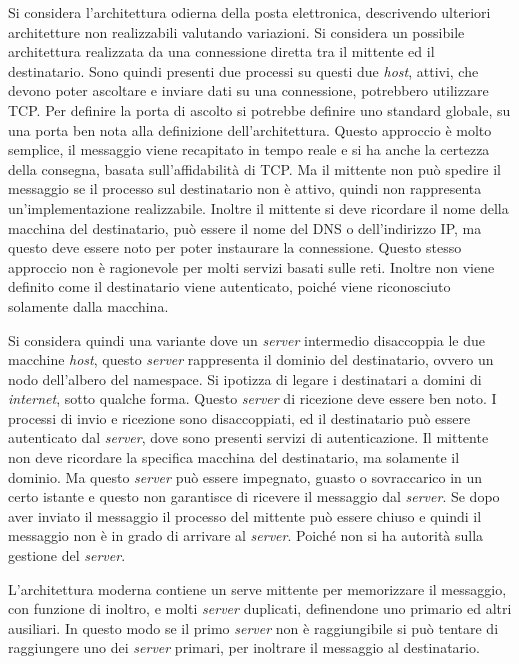 \documentclass{article}
\numberwithin{equation}{subsection}
\begin{document}
Si considera l'architettura odierna della posta elettronica, descrivendo ulteriori architetture non realizzabili valutando variazioni. Si considera un possibile architettura realizzata da una connessione diretta tra il mittente ed il destinatario. Sono quindi presenti due processi su questi due \textit{host}, attivi, che devono poter ascoltare e inviare dati su una connessione, potrebbero utilizzare \textcolor{Bittersweet}{TCP}. Per definire la porta di ascolto si potrebbe definire uno standard globale, su una porta ben nota alla definizione dell'architettura. 
Questo approccio è molto semplice, il messaggio viene recapitato in tempo reale e si ha anche la certezza della consegna, basata sull'affidabilità di \textcolor{Bittersweet}{TCP}. 
Ma il mittente non può spedire il messaggio se il processo sul destinatario non è attivo, quindi non rappresenta un'implementazione realizzabile. Inoltre il mittente si deve ricordare il nome della macchina del destinatario, può essere il nome del \textcolor{Mahogany}{DNS} o dell'indirizzo \textcolor{Bittersweet}{IP}, ma questo deve essere noto per poter instaurare la connessione. 
Questo stesso approccio non è ragionevole per molti servizi basati sulle reti. Inoltre non viene definito come il destinatario viene autenticato, poiché viene riconosciuto solamente dalla macchina. 

Si considera quindi una variante dove un \textit{server} intermedio disaccoppia le due macchine \textit{host}, questo \textit{server} rappresenta il dominio del destinatario, ovvero un nodo dell'albero del namespace. 
Si ipotizza di legare i destinatari a domini di \textit{internet}, sotto qualche forma. Questo \textit{server} di ricezione deve essere ben noto. 
I processi di invio e ricezione sono disaccoppiati, ed il destinatario può essere autenticato dal \textit{server}, dove sono presenti servizi di autenticazione. Il mittente non deve ricordare la specifica macchina del destinatario, ma solamente il dominio. 
Ma questo \textit{server} può essere impegnato, guasto o sovraccarico in un certo istante e questo non garantisce di ricevere il messaggio dal \textit{server}. Se dopo aver inviato il messaggio il processo del mittente può essere chiuso e quindi il messaggio non è in grado di arrivare al \textit{server}. Poiché non si ha autorità sulla gestione del \textit{server}. 

L'architettura moderna contiene un serve mittente per memorizzare il messaggio, con funzione di inoltro, e molti \textit{server} duplicati, definendone uno primario ed altri 
ausiliari. In questo modo se il primo \textit{server} non è raggiungibile si può tentare di raggiungere uno dei \textit{server} primari, per inoltrare il messaggio al destinatario. 
\end{document}
